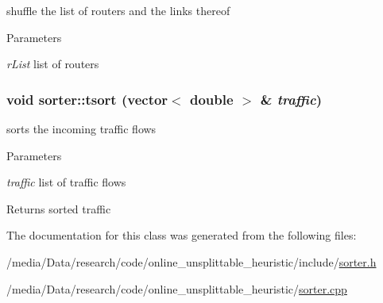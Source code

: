 shuffle the list of routers and the links thereof 


\begin{DoxyParams}{Parameters}
\item[{\em rList}]list of routers \end{DoxyParams}
\hypertarget{classsorter_ae5717a09e1732631a6edcf122f2498c5}{
\subsubsection[{tsort}]{\setlength{\rightskip}{0pt plus 5cm}void sorter::tsort (vector$<$ double $>$ \& {\em traffic})}}
\label{classsorter_ae5717a09e1732631a6edcf122f2498c5}


sorts the incoming traffic flows 


\begin{DoxyParams}{Parameters}
\item[{\em traffic}]list of traffic flows \end{DoxyParams}
\begin{DoxyReturn}{Returns}
sorted traffic 
\end{DoxyReturn}


The documentation for this class was generated from the following files:\begin{DoxyCompactItemize}
\item 
/media/Data/research/code/online\_\-unsplittable\_\-heuristic/include/\hyperlink{sorter_8h}{sorter.h}\item 
/media/Data/research/code/online\_\-unsplittable\_\-heuristic/\hyperlink{sorter_8cpp}{sorter.cpp}\end{DoxyCompactItemize}
